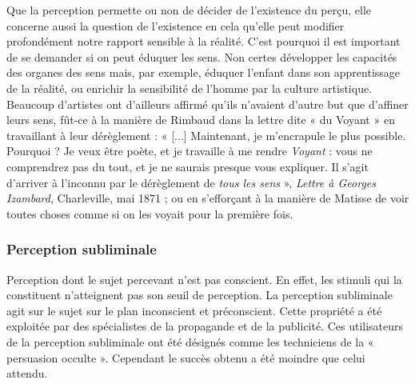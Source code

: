Que la perception permette ou non de
décider de l'existence du perçu, elle
concerne aussi la question de l’existence
en cela qu’elle peut modifier profondément
notre rapport sensible à la réalité.
C’est pourquoi il est important de se
demander si on peut éduquer les sens.
Non certes développer les capacités des
organes des sens mais, par exemple, éduquer
l’enfant dans son apprentissage de la
réalité, ou enrichir la sensibilité de
l’homme par la culture artistique. Beaucoup
d'artistes ont d’ailleurs affirmé qu'ils
n'avaient d’autre but que d’affiner leurs
sens, fût-ce à la manière de Rimbaud dans
la lettre dite « du Voyant » en travaillant
à leur dérèglement : « [...] Maintenant, je
m'encrapule le plus possible. Pourquoi ?
Je veux être poète, et je travaille à me
rendre {\it Voyant} : vous ne comprendrez pas
du tout, et je ne saurais presque vous
expliquer. Il s’agit d’arriver à l'inconnu
par le dérèglement de {\it tous les sens} »,
{\it Lettre à Georges Izambard}, Charleville,
mai 1871 ; ou en s’efforçant à la manière
de Matisse de voir toutes choses comme
si on les voyait pour la première fois.

\subsubsection{Perception subliminale}
Perception dont
le sujet percevant n’est pas conscient. En
effet, les stimuli qui la constituent n’atteignent
pas son seuil de perception. La perception
subliminale agit sur le sujet sur le
plan inconscient et préconscient. Cette
propriété a été exploitée par des spécialistes
de la propagande et de la publicité.
Ces utilisateurs de la perception subliminale
ont été désignés comme les techniciens
de la « persuasion occulte ».
Cependant le succès obtenu a été
moindre que celui attendu.

